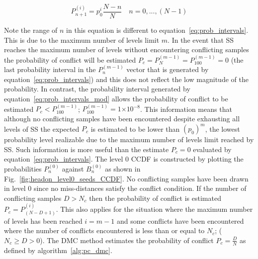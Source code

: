 \documentclass[journal]{IEEEtran}
\providecommand{\e}[1]{\ensuremath{\times 10^{#1}}}
\begin{document}
\begin{equation}	
	P_{n+1}^{(i)} = p_{0}^i\frac{N - n}{N}	\quad n = 0,...,(N-1)
	\label{eq:prob_intervals_mod}
\end{equation}

\noindent Note the range of $n$ in this equation is different to equation~\ref{eq:prob_intervals}. This is due to the maximum number of levels limit $m$. In the event that SS reaches the maximum number of levels without encountering conflicting samples the probability of conflict will be estimated $P_{c} = P_{N}^{(m-1)} = P_{100}^{(m-1)} = 0$ (the last probability interval in the $P_{n}^{(m-1)}$ vector that is generated by equation~\ref{eq:prob_intervals}) and this does not reflect the low magnitude of the probability. In contrast, the probability interval generated by equation~\ref{eq:prob_intervals_mod} allows the probability of conflict to be estimated $P_{c} < P_{100}^{(m-1)}$; $P_{100}^{(m-1)} = 1\e{-8}$. This information means that although no conflicting samples have been encountered despite exhausting all levels of SS the expected $P_{c}$ is estimated to be lower than $(p_{0})^{m}$, the lowest probability level realizable due to the maximum number of levels limit reached by SS. Such information is more useful than the estimate $P_{c} = 0$ evaluated by equation~\ref{eq:prob_intervals}. The level 0 CCDF is constructed by plotting the probabilities $P_{n}^{(0)}$ against $B_{n}^{(0)}$ as shown in Fig.~\ref{fig:headon_level0_seeds_CCDF}. No conflicting samples have been drawn in level 0 since no miss-distances satisfy the conflict condition. If the number of conflicting samples $D > N_{c}$ then the probability of conflict is estimated $P_{c} = P_{(N-D+1)}^{(i)}$. This also applies for the situation where the maximum number of levels has been reached $i = m - 1$ and some conflicts have been encountered where the number of conflicts encountered is less than or equal to $N_{c}$; ($N_{c} \geq D > 0$). The DMC method estimates the probability of conflict $P_{c} = \frac{D}{N}$ as defined by algorithm~\ref{alg:pc_dmc}.
\end{document}
